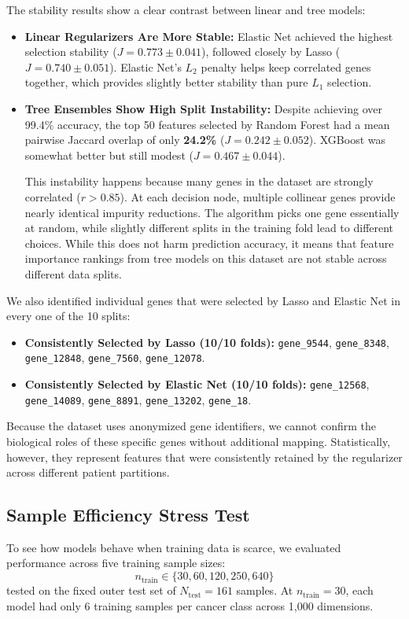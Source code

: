 \documentclass[11pt,a4paper]{article}
\begin{document}
The stability results show a clear contrast between linear and tree models:
\begin{itemize}
    \item \textbf{Linear Regularizers Are More Stable:} Elastic Net achieved the highest selection stability ($J = 0.773 \pm 0.041$), followed closely by Lasso ($J = 0.740 \pm 0.051$). Elastic Net's $L_2$ penalty helps keep correlated genes together, which provides slightly better stability than pure $L_1$ selection.
    \item \textbf{Tree Ensembles Show High Split Instability:} Despite achieving over 99.4\% accuracy, the top 50 features selected by Random Forest had a mean pairwise Jaccard overlap of only \textbf{24.2\%} ($J = 0.242 \pm 0.052$). XGBoost was somewhat better but still modest ($J = 0.467 \pm 0.044$). 
    
    This instability happens because many genes in the dataset are strongly correlated ($r > 0.85$). At each decision node, multiple collinear genes provide nearly identical impurity reductions. The algorithm picks one gene essentially at random, while slightly different splits in the training fold lead to different choices. While this does not harm prediction accuracy, it means that feature importance rankings from tree models on this dataset are not stable across different data splits.
\end{itemize}

We also identified individual genes that were selected by Lasso and Elastic Net in every one of the 10 splits:
\begin{itemize}
    \item \textbf{Consistently Selected by Lasso (10/10 folds):} \texttt{gene\_9544}, \texttt{gene\_8348}, \texttt{gene\_12848}, \linebreak\texttt{gene\_7560}, \texttt{gene\_12078}.
    \item \textbf{Consistently Selected by Elastic Net (10/10 folds):} \texttt{gene\_12568}, \texttt{gene\_14089}, \texttt{gene\_8891}, \linebreak\texttt{gene\_13202}, \texttt{gene\_18}.
\end{itemize}
Because the dataset uses anonymized gene identifiers, we cannot confirm the biological roles of these specific genes without additional mapping. Statistically, however, they represent features that were consistently retained by the regularizer across different patient partitions.

\subsection{Sample Efficiency Stress Test}
To see how models behave when training data is scarce, we evaluated performance across five training sample sizes:
\begin{equation}
    n_{\text{train}} \in \{30, 60, 120, 250, 640\}
\end{equation}
tested on the fixed outer test set of $N_{\text{test}} = 161$ samples. At $n_{\text{train}} = 30$, each model had only 6 training samples per cancer class across 1,000 dimensions.
\end{document}
